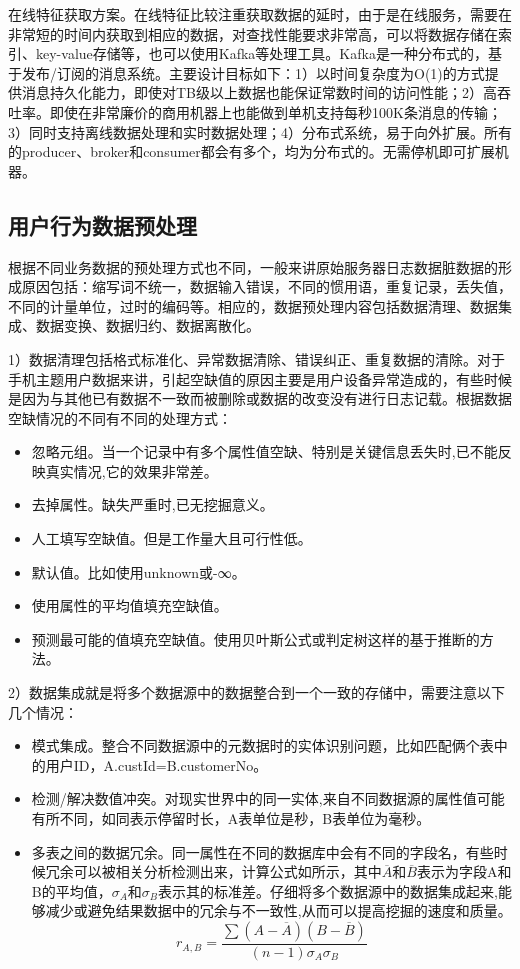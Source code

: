   在线特征获取方案。在线特征比较注重获取数据的延时，由于是在线服务，需要在非常短的时间内获取到相应的数据，对查找性能要求非常高，可以将数据存储在索引、key-value存储等，也可以使用Kafka等处理工具。Kafka是一种分布式的，基于发布/订阅的消息系统。主要设计目标如下：1）以时间复杂度为O(1)的方式提供消息持久化能力，即使对TB级以上数据也能保证常数时间的访问性能；2）高吞吐率。即使在非常廉价的商用机器上也能做到单机支持每秒100K条消息的传输；3）同时支持离线数据处理和实时数据处理；4）分布式系统，易于向外扩展。所有的producer、broker和consumer都会有多个，均为分布式的。无需停机即可扩展机器。

  \subsection{用户行为数据预处理}
  根据不同业务数据的预处理方式也不同，一般来讲原始服务器日志数据脏数据的形成原因包括：缩写词不统一，数据输入错误，不同的惯用语，重复记录，丢失值，不同的计量单位，过时的编码等。相应的，数据预处理内容包括数据清理、数据集成、数据变换、数据归约、数据离散化。

  1）数据清理包括格式标准化、异常数据清除、错误纠正、重复数据的清除。对于手机主题用户数据来讲，引起空缺值的原因主要是用户设备异常造成的，有些时候是因为与其他已有数据不一致而被删除或数据的改变没有进行日志记载。根据数据空缺情况的不同有不同的处理方式：
  \begin{itemize}
  \item 忽略元组。当一个记录中有多个属性值空缺、特别是关键信息丢失时,已不能反映真实情况,它的效果非常差。
  \item 去掉属性。缺失严重时,已无挖掘意义。
  \item 人工填写空缺值。但是工作量大且可行性低。
  \item 默认值。比如使用unknown或-∞。
  \item 使用属性的平均值填充空缺值。
  \item 预测最可能的值填充空缺值。使用贝叶斯公式或判定树这样的基于推断的方法。
  \end{itemize}

  2）数据集成就是将多个数据源中的数据整合到一个一致的存储中，需要注意以下几个情况：
  \begin{itemize}
  \item 模式集成。整合不同数据源中的元数据时的实体识别问题，比如匹配俩个表中的用户ID，A.custId=B.customerNo。
  \item 检测/解决数值冲突。对现实世界中的同一实体,来自不同数据源的属性值可能有所不同，如同表示停留时长，A表单位是秒，B表单位为毫秒。
  \item 多表之间的数据冗余。同一属性在不同的数据库中会有不同的字段名，有些时候冗余可以被相关分析检测出来，计算公式如所示，其中$\overline{A}$和$\overline{B}$表示为字段A和B的平均值，$\sigma_A和\sigma_B$表示其的标准差。仔细将多个数据源中的数据集成起来,能够减少或避免结果数据中的冗余与不一致性,从而可以提高挖掘的速度和质量。
  \begin{equation}
    r_{A,B} = \frac{\sum (A-\overline{A})(B-\overline{B})}{(n-1)\sigma_A\sigma_B}
    \label{F-Measure}
  \end{equation}
  \end{itemize}

